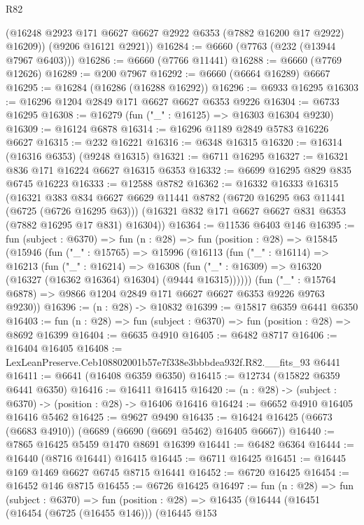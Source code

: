 \begin{lexlean}{R82}
\begin{coremodule}
        (@16248 @2923 @171 @6627 @6627 @2922 @6353 (@7882 @16200 @17 @2922) @16209))
      (@9206 @16121 @2921))
@16284 := @6660 (@7763 (@232 (@13944 @7967 @6403)))
@16286 := @6660 (@7766 @11441)
@16288 := @6660 (@7769 @12626)
@16289 := @200 @7967
@16292 := @6660 (@6664 @16289) @6667
@16295 := @16284 (@16286 (@16288 @16292))
@16296 := @6933 @16295
@16303 := @16296 @1204 @2849 @171 @6627 @6627 @6353 @9226
@16304 := @6733 @16295
@16308 := @16279 (fun ("_" : @16125) => @16303 @16304 @9230)
@16309 := @16124 @6878
@16314 := @16296 @1189 @2849 @5783 @16226 @6627
@16315 := @232 @16221
@16316 := @6348 @16315
@16320 := @16314 (@16316 @6353) (@9248 @16315)
@16321 := @6711 @16295
@16327 := @16321 @836 @171 @16224 @6627 @16315 @6353
@16332 := @6699 @16295 @829 @835 @6745 @16223
@16333 := @12588 @8782
@16362 := @16332
    @16333
    @16315
    (@16321
      @383
      @834
      @6627
      @6629
      @11441
      @8782
      (@6720 @16295 @63 @11441 (@6725 (@6726 @16295 @63)))
      (@16321 @832 @171 @6627 @6627 @831 @6353 (@7882 @16295 @17 @831) @16304))
@16364 := @11536 @6403 @146
@16395 := fun (subject : @6370) =>
  fun (n : @28) =>
  fun (position : @28) =>
  @15845
    (@15946
      (fun ("_" : @15765) =>
      @15996
        (@16113
          (fun ("_" : @16114) =>
          @16213
            (fun ("_" : @16214) =>
            @16308 (fun ("_" : @16309) => @16320 (@16327 (@16362 @16364) @16304) (@9444 @16315))))))
      (fun ("_" : @15764 @6878) => @9866 @1204 @2849 @171 @6627 @6627 @6353 @9226 @9763 @9230))
@16396 := (n : @28) -> @10832
@16399 := @15817 @6359 @6441 @6350
@16403 := fun (n : @28) => fun (subject : @6370) => fun (position : @28) => @8692 @16399
@16404 := @6635 @4910
@16405 := @6482 @8717
@16406 := @16404 @16405
@16408 := LexLeanPreserve.Ceb108802001b57e7f338e3bbbdea932f.R82.__fits_93 @6441
@16411 := @6641 (@16408 @6359 @6350)
@16415 := @12734 (@15822 @6359 @6441 @6350)
@16416 := @16411 @16415
@16420 := (n : @28) -> (subject : @6370) -> (position : @28) -> @16406 @16416
@16424 := @6652 @4910 @16405 @16416 @5462
@16425 := @9627 @9490
@16435 := @16424 @16425 (@6673 (@6683 @4910)) (@6689 (@6690 (@6691 @5462) @16405 @6667))
@16440 := @7865 @16425 @5459 @1470 @8691 @16399
@16441 := @6482 @6364
@16444 := @16440 (@8716 @16441) @16415
@16445 := @6711 @16425
@16451 := @16445 @169 @1469 @6627 @6745 @8715 @16441
@16452 := @6720 @16425
@16454 := @16452 @146 @8715
@16455 := @6726 @16425
@16497 := fun (n : @28) =>
  fun (subject : @6370) =>
  fun (position : @28) =>
  @16435
    (@16444
      (@16451
        (@16454 (@6725 (@16455 @146)))
        (@16445
          @153

\end{coremodule}
\end{lexlean}
